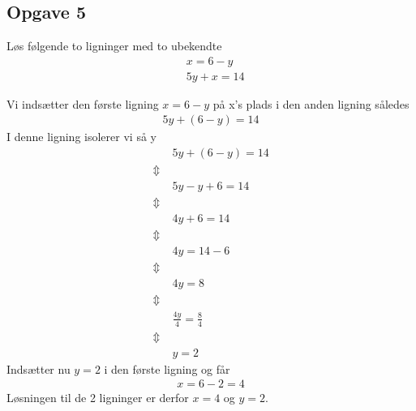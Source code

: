 \subsection{Opgave 5}

Løs følgende to ligninger med to ubekendte
\begin{align*}
   &x = 6 - y\\
    &5y + x = 14
\end{align*}

\ans
Vi indsætter den første ligning $x = 6-y$ på x's plads i den anden ligning således
\begin{align*}
    5y + (6 - y) = 14
\end{align*}
I denne ligning isolerer vi så y
\begin{align*}
    &5y + (6 - y) = 14\\
    \Updownarrow \; &\\
    &5y - y + 6 = 14\\
    \Updownarrow \; &\\
    &4y + 6 = 14\\
    \Updownarrow \; &\\
    &4y = 14 - 6\\
    \Updownarrow \; &\\
    &4y = 8\\
    \Updownarrow \; &\\
    &\frac{4y}{4} = \frac{8}{4}\\
    \Updownarrow \; &\\
    &y = 2
\end{align*}
Indsætter nu $y = 2$ i den første ligning og får
\begin{align*}
    x = 6 - 2 = 4
\end{align*}
Løsningen til de 2 ligninger er derfor $x = 4$ og $y = 2$. 